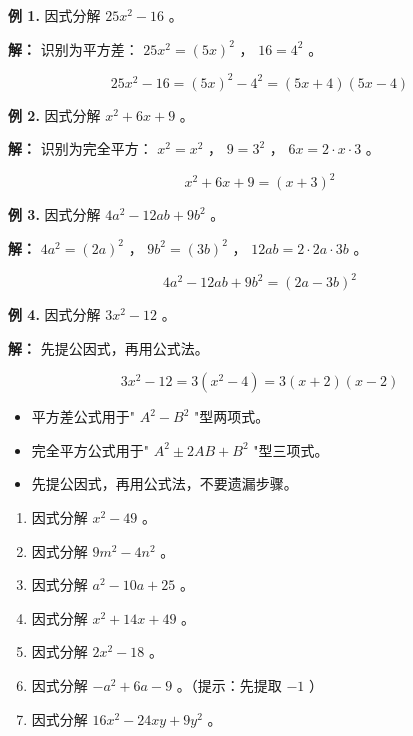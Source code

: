 \begin{workedexamples}


\textbf{例 1.} 因式分解 $25x^2 - 16$ 。

\textbf{解：} 识别为平方差： $25x^2 = (5x)^2$ ， $16 = 4^2$ 。

\[
25x^2 - 16 = (5x)^2 - 4^2 = (5x + 4)(5x - 4)
\]


\textbf{例 2.} 因式分解 $x^2 + 6x + 9$ 。

\textbf{解：} 识别为完全平方： $x^2 = x^2$ ， $9 = 3^2$ ， $6x = 2 \cdot x \cdot 3$ 。

\[
x^2 + 6x + 9 = (x + 3)^2
\]


\textbf{例 3.} 因式分解 $4a^2 - 12ab + 9b^2$ 。

\textbf{解：} $4a^2 = (2a)^2$ ， $9b^2 = (3b)^2$ ， $12ab = 2 \cdot 2a \cdot 3b$ 。

\[
4a^2 - 12ab + 9b^2 = (2a - 3b)^2
\]


\textbf{例 4.} 因式分解 $3x^2 - 12$ 。

\textbf{解：} 先提公因式，再用公式法。

\[
3x^2 - 12 = 3(x^2 - 4) = 3(x + 2)(x - 2)
\]


\end{workedexamples}

\begin{keytakeaway}


\begin{itemize}
  \item 平方差公式用于" $A^2 - B^2$ "型两项式。
  \item 完全平方公式用于" $A^2 \pm 2AB + B^2$ "型三项式。
  \item 先提公因式，再用公式法，不要遗漏步骤。
\end{itemize}


\end{keytakeaway}

\begin{practice}


\begin{enumerate}
  \item 因式分解 $x^2 - 49$ 。
  \item 因式分解 $9m^2 - 4n^2$ 。
  \item 因式分解 $a^2 - 10a + 25$ 。
  \item 因式分解 $x^2 + 14x + 49$ 。
  \item 因式分解 $2x^2 - 18$ 。
  \item 因式分解 $-a^2 + 6a - 9$ 。（提示：先提取 $-1$ ）
  \item 因式分解 $16x^2 - 24xy + 9y^2$ 。
\end{enumerate}


\end{practice}

